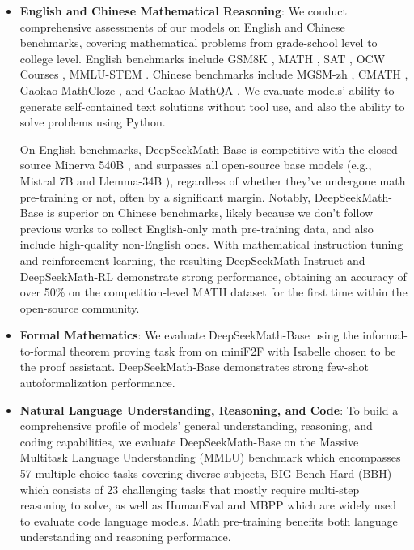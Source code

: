 \begin{itemize}[topsep=0pt]
    \item \textbf{English and Chinese Mathematical Reasoning}: We conduct comprehensive assessments of our models on English and Chinese benchmarks, covering mathematical problems from grade-school level to college level. English benchmarks include GSM8K \citep{gsm8k}, MATH \citep{MATH}, SAT \citep{llemma}, OCW Courses \citep{minerva}, MMLU-STEM \citep{mmlu}. Chinese benchmarks include MGSM-zh \citep{mgsm}, CMATH \citep{wei2023cmath}, Gaokao-MathCloze \citep{agieval}, and Gaokao-MathQA \citep{agieval}. We evaluate models' ability to generate self-contained text solutions without tool use, and also the ability to solve problems using Python.

    On English benchmarks, DeepSeekMath-Base is competitive with the closed-source Minerva 540B \citep{minerva}, and surpasses all open-source base models (e.g., Mistral 7B \citep{mistral} and Llemma-34B \citep{llemma}), regardless of whether they've undergone math pre-training or not, often by a significant margin. Notably, DeepSeekMath-Base is superior on Chinese benchmarks, likely because we don't follow previous works \citep{minerva,llemma} to collect English-only math pre-training data, and also include high-quality non-English ones. With mathematical instruction tuning and reinforcement learning, the resulting DeepSeekMath-Instruct and DeepSeekMath-RL demonstrate strong performance, obtaining an accuracy of over 50\% on the competition-level MATH dataset for the first time within the open-source community.

    \item \textbf{Formal Mathematics}: We evaluate DeepSeekMath-Base using the informal-to-formal theorem proving task from \citep{dsp_proof} on miniF2F \citep{minif2f} with Isabelle \citep{isabelle} chosen to be the proof assistant. DeepSeekMath-Base demonstrates strong few-shot autoformalization performance.
    \item \textbf{Natural Language Understanding, Reasoning, and Code}: To build a comprehensive profile of models' general understanding, reasoning, and coding capabilities, we evaluate DeepSeekMath-Base on the Massive Multitask Language Understanding (MMLU) benchmark \citep{mmlu} which encompasses 57 multiple-choice tasks covering diverse subjects, BIG-Bench Hard (BBH) \citep{bbh} which consists of 23 challenging tasks that mostly require multi-step reasoning to solve, as well as HumanEval \citep{codex} and MBPP \citep{mbpp} which are widely used to evaluate code language models. Math pre-training benefits both language understanding and reasoning performance.
\end{itemize}

